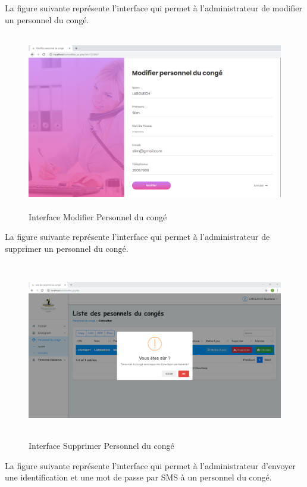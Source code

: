 \documentclass[12 pt ]{report}
\begin{document}
La figure suivante représente l'interface qui permet à l'administrateur de modifier un personnel du congé.
\begin{figure}[h]
 \begin{center}
\includegraphics[width= 18 cm ,height=  7.75cm]{modifier_pc.PNG}
\caption{Interface Modifier Personnel du congé}

\end{center}
\end{figure}
\newpage
La figure suivante représente l'interface qui permet à l'administrateur de supprimer un personnel du congé.
\begin{figure}[h]
 \begin{center}
\includegraphics[width= 16 cm ,height=  7.75cm]{supprimer_pc.PNG}
\caption{Interface Supprimer Personnel du congé}

\end{center}
\end{figure}
La figure suivante représente l'interface qui permet à l'administrateur d'envoyer une identification et une mot de passe par SMS à un personnel du congé.
\end{document}
